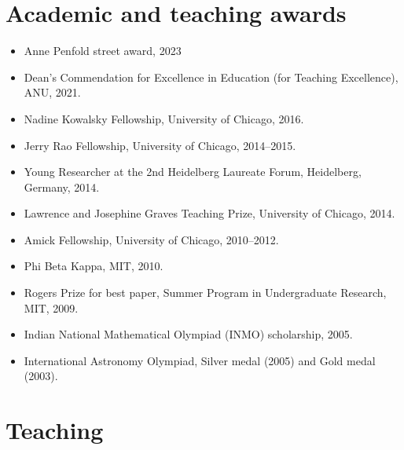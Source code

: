 \documentclass[a4paper]{moderncv}
\begin{document}
\section*{Academic and teaching awards}
\label{sec:org2d81d6e}
\begin{itemize}
\item Anne Penfold street award, 2023
\item Dean's Commendation for Excellence in Education (for Teaching Excellence), ANU, 2021.
\item Nadine Kowalsky Fellowship, University of Chicago, 2016.
\item Jerry Rao Fellowship, University of Chicago, 2014--2015.
\item Young Researcher at the 2nd Heidelberg Laureate Forum, Heidelberg, Germany, 2014.
\item Lawrence and Josephine Graves Teaching Prize, University of Chicago, 2014.
\item Amick Fellowship, University of Chicago, 2010--2012.
\item Phi Beta Kappa, MIT, 2010.
\item Rogers Prize for best paper, Summer Program in Undergraduate Research, MIT, 2009.
\item Indian National Mathematical Olympiad (INMO) scholarship, 2005.
\item International Astronomy Olympiad, Silver medal (2005) and Gold medal (2003).
\end{itemize}

\section*{Teaching}
\label{sec:org8eee660}
\end{document}
